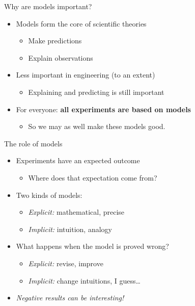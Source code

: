 \documentclass{beamer}
\begin{document}

\begin{frame}{Why are models important?}
    \begin{itemize}
        \item Models form the core of scientific theories
            \begin{itemize}
                \item Make predictions
                \item Explain observations
            \end{itemize}
        \item Less important in engineering (to an extent)
            \begin{itemize}
                \item Explaining and predicting is still important
            \end{itemize}
        \item For everyone: \textbf{all experiments are based on models}
            \begin{itemize}
                \item {\footnotesize So we may as well make these models good.}
            \end{itemize}
    \end{itemize}
\end{frame}

\begin{frame}{The role of models}
    \begin{itemize}
        \item Experiments have an expected outcome
            \begin{itemize}
                \item Where does that expectation come from?
            \end{itemize}
        \item Two kinds of models:
            \begin{itemize}
                \item \textit{Explicit:} mathematical, precise
                \item \textit{Implicit:} intuition, analogy
            \end{itemize}
        \item What happens when the model is proved wrong?
            \begin{itemize}
                \item \textit{Explicit:} revise, improve
                \item \textit{Implicit:} change intuitions, I guess\ldots
            \end{itemize}
        \item \emph{Negative results can be interesting!}
    \end{itemize}
\end{frame}
\end{document}
